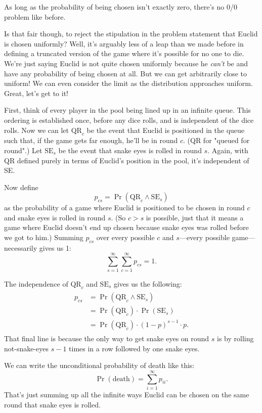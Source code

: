 \documentclass[article,twocolumn]{memoir}
\begin{document}
As long as the probability of being chosen isn't exactly zero, there's no 0/0 problem like before.

Is that fair though, to reject the stipulation in the problem statement that Euclid is chosen uniformly?
Well, it's arguably less of a leap than we made before in defining a truncated version of the game where it's possible for no one to die.
We're just saying Euclid is not quite chosen uniformly because he \emph{can't} be and have any probability of being chosen at all.
But we can get arbitrarily close to uniform!
We can even consider the limit as the distribution approaches uniform.
Great, let's get to it!

First, think of every player in the pool being lined up in an infinite queue.
This ordering is established once, before any dice rolls, and is independent of the dice rolls.
Now we can let $\text{QR}_c$ be the event that Euclid is positioned in the queue such that, if the game gets far enough, he'll be in round $c$.
(QR for "queued for round".)
Let $\text{SE}_s$ be the event that snake eyes is rolled in round $s$.
Again, with QR defined purely in terms of Euclid's position in the pool, it's independent of SE.

Now define 
$$p_{cs} = \Pr(\text{QR}_c\land \text{SE}_s)$$
as the probability of a game where Euclid is positioned to be chosen in round $c$ and snake eyes is rolled in round $s$.
(So $c>s$ is possible, just that it means a game where Euclid doesn't end up chosen because snake eyes was rolled before we got to him.)
Summing $p_{cs}$ over every possible $c$ and $s$---every possible game---necessarily gives us 1:
$$\sum_{s=1}^\infty \sum_{c=1}^\infty p_{cs} = 1.$$

The independence of $\text{QR}_c$ and $\text{SE}_s$ gives us the following:
\begin{align}\label{pcs}
\begin{split}
p_{cs} & = \Pr(\text{QR}_c\land\text{SE}_s) \\
       & = \Pr(\text{QR}_c)\cdot\Pr(\text{SE}_s) \\
       & = \Pr(\text{QR}_c)\cdot(1-p)^{s-1}\cdot p.
\end{split}
\end{align}
That final line is because the only way to get snake eyes on round $s$ is by rolling not-snake-eyes $s-1$ times in a row followed by one snake eyes.

We can write the unconditional probability of death like this:
\begin{equation}\label{d}
\Pr(\text{death}) = \sum_{i=1}^\infty p_{ii}.
\end{equation}
That's just summing up all the infinite ways Euclid can be chosen on the same round that snake eyes is rolled.
\end{document}
